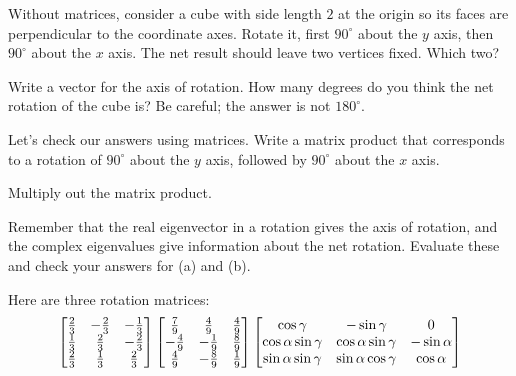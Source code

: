 \documentclass[../gatm_answers.tex]{subfiles}
\begin{document}
\begin{outer_problem}
\item
\end{outer_problem}

\begin{inner_problem}[start=1]
\item Without matrices, consider a cube with side length $2$ at the origin so its faces are perpendicular to the coordinate axes. Rotate it, first $90^\circ$ about the $y$ axis, then $90^\circ$ about the $x$ axis. The net result should leave two vertices fixed. Which two?
\end{inner_problem}

\begin{inner_problem}
\item Write a vector for the axis of rotation. How many degrees do you think the net rotation of the cube is? Be careful; the answer is not $180^\circ$.
\end{inner_problem}

\begin{inner_problem}
\item Let's check our answers using matrices. Write a matrix product that corresponds to a rotation of $90^\circ$ about the $y$ axis, followed by $90^\circ$ about the $x$ axis.
\end{inner_problem}

\begin{inner_problem}
\item Multiply out the matrix product.
\end{inner_problem}

\begin{inner_problem}
\item Remember that the real eigenvector in a rotation gives the axis of rotation, and the complex eigenvalues give information about the net rotation. Evaluate these and check your answers for (a) and (b).
\end{inner_problem}

\begin{outer_problem}
\item Here are three rotation matrices:
$$\begin{bmatrix} \frac{2}{3} & -\frac{2}{3} & -\frac{1}{3} \\ \frac{1}{3} & \frac{2}{3} & -\frac{2}{3} \\ \frac{2}{3} & \frac{1}{3} & \frac{2}{3} \end{bmatrix}
\begin{bmatrix} \frac{7}{9} & \frac{4}{9} & \frac{4}{9} \\ -\frac{4}{9} & -\frac{1}{9} & \frac{8}{9} \\ \frac{4}{9} & -\frac{8}{9} & \frac{1}{9} \end{bmatrix}
\begin{bmatrix} \cos\gamma & -\sin\gamma & 0 \\ \cos\alpha\sin\gamma & \cos\alpha\sin\gamma & -\sin\alpha \\ \sin\alpha\sin\gamma & \sin\alpha\cos\gamma & \cos\alpha \end{bmatrix}$$
\end{outer_problem}
\end{document}
